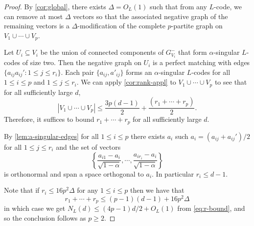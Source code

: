 \documentclass[reqno, 11pt]{amsart}
\theoremstyle{definition}
\theoremstyle{remark}
\begin{document}
\begin{proof}
    By  \cref{cor:global}, there exists $\Delta = O_L(1)$ such that from any $L$-code, we can remove at most $\Delta$ vectors so that the associated negative graph of the remaining vectors is a $\Delta$-modification of the complete $p$-partite graph on $V_1 \cup \cdots \cup V_p$. 
    
    Let $U_i \subseteq V_i$ be the union of connected components of $G_{V_i}^-$ that form $\alpha$-singular $L$-codes of size two. 
    Then the negative graph on $U_i$ is a perfect matching with edges $\{a_{ij}a_{ij}' : 1 \le j \le r_i\}$. Each pair $\{ a_{ij}, a'_{ij}\}$ forms an $\alpha$-singular $L$-codes for all $1 \leq i \leq p$ and $1 \leq j \leq r_i$. We can apply \cref{cor:rank-appl} to $V_1 \cup \cdots \cup V_p$ to see that for all sufficiently large $d$,
    \begin{equation}\label{eq:r-bound}
        |V_1 \cup \cdots \cup V_p| \leq \frac{3p(d-1)}{2} + \frac{(r_1 + \cdots + r_p)}{2}. \tag{$\dagger$}
    \end{equation}
    Therefore, it suffices to bound $r_1 + \cdots + r_p$ for all sufficiently large $d$.

     By \cref{lem:a-singular-edges} for all $1 \leq i \leq p$ there exists $a_i$ such $a_i = (a_{ij} + a_{ij}')/2$ for all $1 \leq j \leq r_i$  and the set of vectors
\[
    \left\{ \frac{ a_{i1} -  a_i}{\sqrt{1-\alpha}}, \cdots,  \frac{ a_{ir_i} -  a_i}{\sqrt{1-\alpha}}\right\}
\]
    is orthonormal and span a space orthogonal to $a_i$. In particular  $r_i \leq d-1$.
    
    Note that if $r_{i} \leq 16p^2\Delta$ for any $1 \leq i \leq p$ then we have that
    \[
        r_1 + \cdots + r_p \leq (p-1)(d-1) + 16 p^2 \Delta
    \]
    in which case we get $N_L(d) \leq (4p - 1)d/2 + O_L(1)$ from \cref{eq:r-bound}, and so the conclusion follows as $p \geq 2$.


\end{proof}
\end{document}
